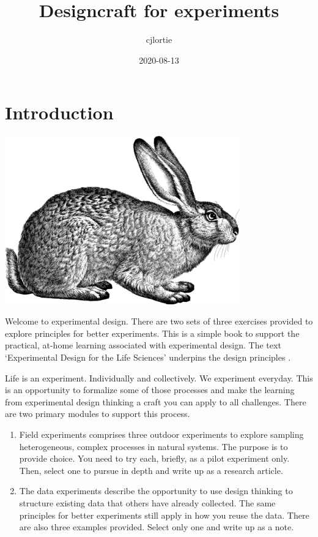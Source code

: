 \documentclass[
]{book}
\title{Designcraft for experiments}
\author{cjlortie}
\date{2020-08-13}
\begin{document}
\maketitle

{
\setcounter{tocdepth}{1}
\tableofcontents
}
\hypertarget{introduction}{%
\chapter{Introduction}\label{introduction}}

\includegraphics[width=4in,height=\textheight]{./rabbit.png}

Welcome to experimental design. There are two sets of three exercises provided to explore principles for better experiments. This is a simple book to support the practical, at-home learning associated with experimental design. The text `Experimental Design for the Life Sciences' underpins the design principles \citep{RN6381}.

Life is an experiment. Individually and collectively. We experiment everyday. This is an opportunity to formalize some of those processes and make the learning from experimental design thinking a craft you can apply to all challenges. There are two primary modules to support this process.

\begin{enumerate}
\def\labelenumi{(\arabic{enumi})}
\item
  Field experiments comprises three outdoor experiments to explore sampling heterogeneous, complex processes in natural systems. The purpose is to provide choice. You need to try each, briefly, as a pilot experiment only. Then, select one to pursue in depth and write up as a research article.
\item
  The data experiments describe the opportunity to use design thinking to structure existing data that others have already collected. The same principles for better experiments still apply in how you reuse the data. There are also three examples provided. Select only one and write up as a note.
\end{enumerate}
\end{document}
